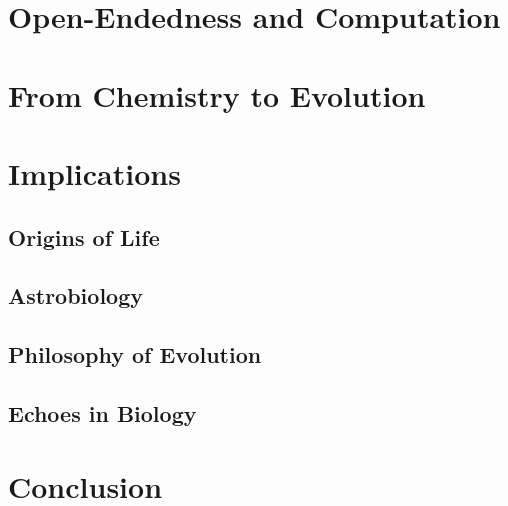 \documentclass[life,article,submit,pdftex,moreauthors]{Definitions/mdpi}
\begin{document}
\section{Open-Endedness and Computation}

\section{From Chemistry to Evolution}

\section{Implications}
\subsection{Origins of Life}
\subsection{Astrobiology}
\subsection{Philosophy of Evolution}
\subsection{Echoes in Biology}

\section{Conclusion}






\acknowledgments{}

\end{document}
